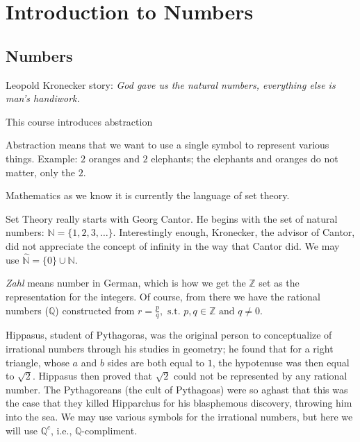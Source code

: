 \documentclass{article}
\begin{document}

\section{Introduction to Numbers}

\subsection{Numbers}

Leopold Kronecker story: \textit{God gave us the natural numbers, everything else is man's handiwork.}



This course introduces abstraction

\begin{definition}[Abstraction]
  Abstraction means that we want to use a single symbol to represent various things. Example: $2$ oranges and $2$ elephants; the elephants and oranges do not matter, only the $2$. 

\end{definition}

Mathematics as we know it is currently the language of set theory. 

Set Theory really starts with Georg Cantor. He begins with the set of natural numbers: \( \mathbb{N}=\{1,2,3,\ldots \} \). Interestingly enough, Kronecker, the advisor of Cantor, did not appreciate the concept of infinity in the way that Cantor did. We may use \( \hat{\mathbb{N}} =\{0\} \cup \mathbb{N}  \). 

\textit{Zahl} means number in German, which is how we get the \( \mathbb{Z} \) set as the representation for the integers. Of course, from there we have the rational numbers (\( \mathbb{Q} \)) constructed from \( r=\frac{p}{q}, \text{ s.t. } p,q\in \mathbb{Z} \text{ and } q\neq 0\). 

Hippasus, student of Pythagoras, was the original person to conceptualize of irrational numbers through his studies in geometry; he found that for a right triangle, whose \( a \) and \( b \) sides are both equal to \( 1 \), the hypotenuse was then equal to \( \sqrt{2}  \). Hippasus then proved that \( \sqrt{2}  \) could not be represented by any rational number. The Pythagoreans (the cult of Pythagoas) were so aghast that this was the case that they killed Hipparchus for his blasphemous discovery, throwing him into the sea. We may use various symbols for the irrational numbers, but here we will use \( \mathbb{Q}^c \), i.e., \( \mathbb{Q} \)-compliment.
\end{document}
